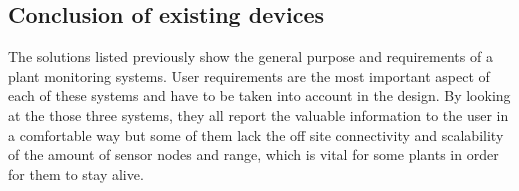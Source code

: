 \subsection{Conclusion of existing devices}

The solutions listed previously show the general purpose and requirements of a plant monitoring systems. User requirements are the most important aspect of each of these systems and have to be taken into account in the design. By looking at the those three systems, they all report the valuable information to the user in a comfortable way but some of them lack the off site connectivity and scalability of the amount of sensor nodes and range, which is vital for some plants in order for them to stay alive. 
